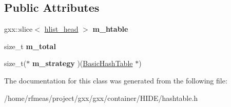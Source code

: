 \subsection*{Public Attributes}
\begin{DoxyCompactItemize}
\item 
gxx\+::slice$<$ \hyperlink{structhlist__head}{hlist\+\_\+head} $>$ {\bfseries m\+\_\+htable}\hypertarget{classgxx_1_1BasicHashTable_ac34d8677dfeaa91be07dca449dfdf238}{}\label{classgxx_1_1BasicHashTable_ac34d8677dfeaa91be07dca449dfdf238}

\item 
size\+\_\+t {\bfseries m\+\_\+total}\hypertarget{classgxx_1_1BasicHashTable_a039e3aacf067662d55448e90aadf8cd6}{}\label{classgxx_1_1BasicHashTable_a039e3aacf067662d55448e90aadf8cd6}

\item 
size\+\_\+t($\ast$ {\bfseries m\+\_\+strategy} )(\hyperlink{classgxx_1_1BasicHashTable}{Basic\+Hash\+Table} $\ast$)\hypertarget{classgxx_1_1BasicHashTable_ad1bcb87e0a019fcc8a72f862e0f7fde3}{}\label{classgxx_1_1BasicHashTable_ad1bcb87e0a019fcc8a72f862e0f7fde3}

\end{DoxyCompactItemize}


The documentation for this class was generated from the following file\+:\begin{DoxyCompactItemize}
\item 
/home/rfmeas/project/gxx/gxx/container/\+H\+I\+D\+E/hashtable.\+h\end{DoxyCompactItemize}
